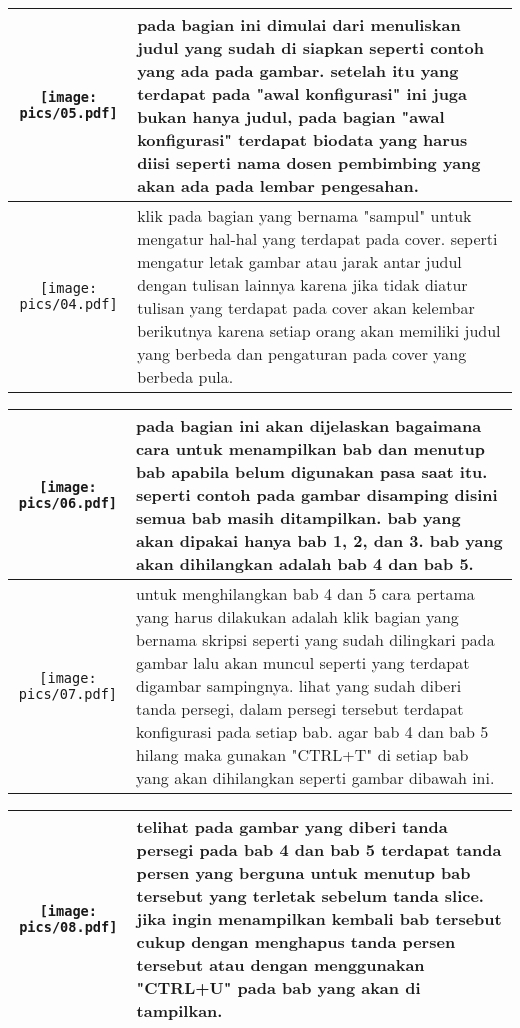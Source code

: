 \documentclass{article}
\begin{document}
\begin{table}
\centering
\begin{tabular}{|c|p{4cm}|} \hline
	
		\texttt{[image: pics/05.pdf]} & pada bagian ini dimulai  dari menuliskan judul yang sudah  di siapkan seperti contoh  yang ada pada gambar. setelah itu yang terdapat  pada "awal konfigurasi" ini juga  bukan hanya judul, pada bagian "awal konfigurasi"  terdapat biodata yang harus diisi seperti nama dosen  pembimbing yang akan  ada pada lembar pengesahan. \\ \hline
		
		\texttt{[image: pics/04.pdf]} & klik pada bagian yang  bernama "sampul" untuk mengatur  hal-hal yang terdapat  pada cover. seperti mengatur letak gambar  atau jarak antar judul dengan tulisan lainnya karena jika tidak diatur tulisan yang terdapat  pada cover akan kelembar  berikutnya karena setiap orang akan memiliki judul yang berbeda dan pengaturan pada cover yang berbeda pula. \\ \hline
		
			\end{tabular}
		\end{table}
	\begin{table}
		\centering
		\begin{tabular}{|c|p{4cm}|} \hline
		
		\texttt{[image: pics/06.pdf]} & pada bagian ini akan dijelaskan bagaimana cara untuk menampilkan bab dan menutup bab apabila belum digunakan pasa saat itu. seperti contoh pada gambar disamping disini semua bab masih ditampilkan. bab yang akan dipakai hanya bab 1, 2, dan 3. bab yang akan dihilangkan adalah bab 4 dan bab 5. \\ \hline
		
		\texttt{[image: pics/07.pdf]} & untuk menghilangkan bab 4 dan 5 cara pertama yang harus dilakukan adalah klik bagian yang bernama skripsi seperti yang sudah dilingkari pada gambar lalu akan muncul seperti yang terdapat digambar sampingnya. lihat yang sudah diberi tanda persegi, dalam persegi tersebut terdapat konfigurasi pada setiap bab. agar bab 4 dan bab 5 hilang maka gunakan "CTRL+T" di setiap bab yang akan dihilangkan seperti gambar dibawah ini. \\ \hline
	\end{tabular}
\end{table}
\begin{table}
		\begin{tabular}{|c|p{4cm}|} \hline


		\texttt{[image: pics/08.pdf]} & telihat pada gambar yang diberi tanda persegi pada bab 4 dan bab 5 terdapat tanda persen yang berguna untuk menutup bab tersebut yang terletak sebelum tanda slice. jika ingin menampilkan kembali bab tersebut cukup dengan menghapus tanda persen tersebut atau dengan menggunakan "CTRL+U" pada bab yang akan di tampilkan. \\ \hline
		
	\end{tabular}
\end{table}
\end{document}
